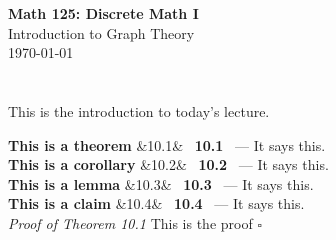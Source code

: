 \documentclass[12pt]{article}
\newcommand{\classinfo}[3]{
    \begin{center}
        {\Large \textbf{#1}} \\ %
        \vspace{0.5cm}
        {\Large #2} \\ %
        \vspace{0.5cm}
        {\large #3}   %
    \end{center}
    \vspace{0.5cm} %
}
\newcommand{\thm}[3][]{ %
    \noindent\textbf{#2} %
    \ifx&#1& %
    \else
        \ \textbf{#1} %
    \fi
    \ --- %
    #3 %
}
\newcommand{\clm}[3][]{ %
    \noindent\textbf{#2} %
    \ifx&#1& %
    \else
        \ \textbf{#1} %
    \fi
    \ --- %
    #3 %
}
\newcommand{\crl}[3][]{ %
    \noindent\textbf{#2} %
    \ifx&#1& %
    \else
        \ \textbf{#1} %
    \fi
    \ --- %
    #3 %
}
\newcommand{\lma}[3][]{ %
    \noindent\textbf{#2} %
    \ifx&#1& %
    \else
        \ \textbf{#1} %
    \fi
    \ --- %
    #3 %
}
\newcommand{\proof}[2]{ %
    \vspace{0.3cm} %
    \noindent\textit{#1} %
    \hspace{0.2cm} #2 %
    \hfill$\square$ %
    \vspace{0.3cm} %
}
\begin{document}
\classinfo{Math 125: Discrete Math I}{Introduction to Graph Theory}{\today}

\section*{}
This is the introduction to today's lecture.

\thm[10.1]{This is a theorem}{It says this.}\\
\crl[10.2]{This is a corollary}{It says this.}\\
\lma[10.3]{This is a lemma}{It says this.}\\
\clm[10.4]{This is a claim}{It says this.}\\
\proof{Proof of Theorem 10.1}{This is the proof}
\end{document}
